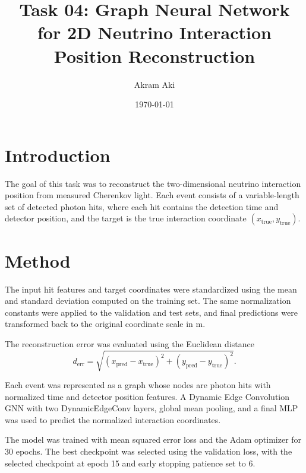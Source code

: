 

\title{Task 04: Graph Neural Network for 2D Neutrino Interaction Position Reconstruction}
\author{Akram Aki}
\date{\today}



\maketitle

\section{Introduction}

The goal of this task was to reconstruct the two-dimensional neutrino interaction position from measured Cherenkov light. 
Each event consists of a variable-length set of detected photon hits, where each hit contains the detection time and detector position, and the target 
is the true interaction coordinate $(x_{\mathrm{true}}, y_{\mathrm{true}})$.

\section{Method}

The input hit features and target coordinates were standardized using the mean and standard deviation computed on the training set. 
The same normalization constants were applied to the validation and test sets, and final predictions were transformed back to the 
original coordinate scale in $\mathrm{m}$.

The reconstruction error was evaluated using the Euclidean distance
\begin{equation*}
    d_{\mathrm{err}} = \sqrt{ (x_{\mathrm{pred}} - x_{\mathrm{true}})^2 + (y_{\mathrm{pred}} - y_{\mathrm{true}})^2 }.
\end{equation*}

Each event was represented as a graph whose nodes are photon hits with normalized time and detector position features. 
A Dynamic Edge Convolution GNN with two DynamicEdgeConv layers, global mean pooling, and a final MLP was used to predict the normalized interaction coordinates.

The model was trained with mean squared error loss and the Adam optimizer for 30 epochs. The best checkpoint was selected using the validation loss, 
with the selected checkpoint at epoch 15 and early stopping patience set to 6.

